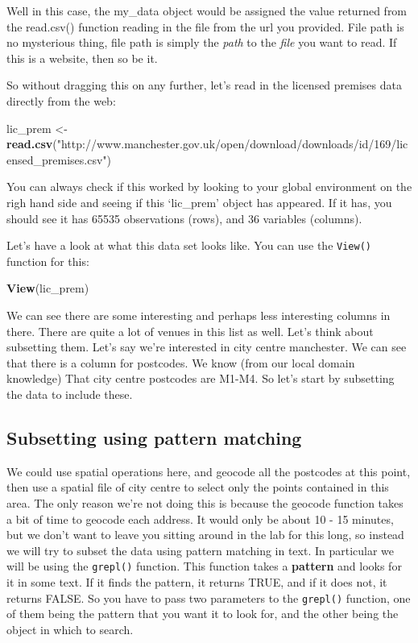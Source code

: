 \documentclass[]{book}
\newenvironment{Shaded}{\begin{snugshade}}{\end{snugshade}}
\newcommand{\KeywordTok}[1]{\textcolor[rgb]{0.13,0.29,0.53}{\textbf{#1}}}
\newcommand{\NormalTok}[1]{#1}
\newcommand{\StringTok}[1]{\textcolor[rgb]{0.31,0.60,0.02}{#1}}
\begin{document}
Well in this case, the my\_data object would be assigned the value returned from the read.csv() function reading in the file from the url you provided. File path is no mysterious thing, file path is simply the \emph{path} to the \emph{file} you want to read. If this is a website, then so be it.

So without dragging this on any further, let's read in the licensed premises data directly from the web:

\begin{Shaded}
\begin{Highlighting}[]
\NormalTok{lic_prem <-}\StringTok{ }\KeywordTok{read.csv}\NormalTok{(}\StringTok{"http://www.manchester.gov.uk/open/download/downloads/id/169/licensed_premises.csv"}\NormalTok{)}
\end{Highlighting}
\end{Shaded}

You can always check if this worked by looking to your global environment on the righ hand side and seeing if this `lic\_prem' object has appeared. If it has, you should see it has 65535 observations (rows), and 36 variables (columns).

Let's have a look at what this data set looks like. You can use the \texttt{View()} function for this:

\begin{Shaded}
\begin{Highlighting}[]
\KeywordTok{View}\NormalTok{(lic_prem)}
\end{Highlighting}
\end{Shaded}

We can see there are some interesting and perhaps less interesting columns in there. There are quite a lot of venues in this list as well. Let's think about subsetting them. Let's say we're interested in city centre manchester. We can see that there is a column for postcodes. We know (from our local domain knowledge) That city centre postcodes are M1-M4. So let's start by subsetting the data to include these.

\hypertarget{subsetting-using-pattern-matching}{%
\subsection{Subsetting using pattern matching}\label{subsetting-using-pattern-matching}}

We could use spatial operations here, and geocode all the postcodes at this point, then use a spatial file of city centre to select only the points contained in this area. The only reason we're not doing this is because the geocode function takes a bit of time to geocode each address. It would only be about 10 - 15 minutes, but we don't want to leave you sitting around in the lab for this long, so instead we will try to subset the data using pattern matching in text. In particular we will be using the \texttt{grepl()} function. This function takes a \textbf{pattern} and looks for it in some text. If it finds the pattern, it returns TRUE, and if it does not, it returns FALSE. So you have to pass two parameters to the \texttt{grepl()} function, one of them being the pattern that you want it to look for, and the other being the object in which to search.
\end{document}

